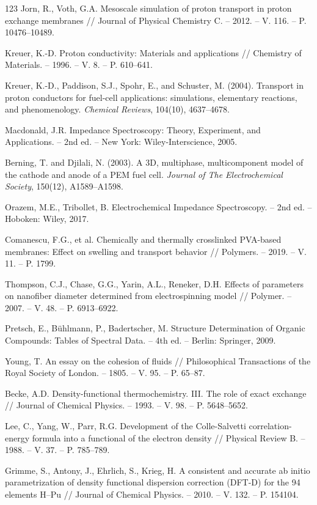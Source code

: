 \documentclass[12pt,a4paper]{report}
\begin{document}
\begin{thebibliography}{123}
 Jorn, R., Voth, G.A. Mesoscale simulation of proton transport in proton exchange membranes // Journal of Physical Chemistry C. – 2012. – V. 116. – P. 10476–10489.

 Kreuer, K.-D. Proton conductivity: Materials and applications // Chemistry of Materials. – 1996. – V. 8. – P. 610–641.

 Kreuer, K.-D., Paddison, S.J., Spohr, E., and Schuster, M. (2004). Transport in proton conductors for fuel-cell applications: simulations, elementary reactions, and phenomenology. \textit{Chemical Reviews}, 104(10), 4637–4678.

 Macdonald, J.R. Impedance Spectroscopy: Theory, Experiment, and Applications. – 2nd ed. – New York: Wiley-Interscience, 2005.

 Berning, T. and Djilali, N. (2003). A 3D, multiphase, multicomponent model of the cathode and anode of a PEM fuel cell. \textit{Journal of The Electrochemical Society}, 150(12), A1589–A1598.

 Orazem, M.E., Tribollet, B. Electrochemical Impedance Spectroscopy. – 2nd ed. – Hoboken: Wiley, 2017.

 Comanescu, F.G., et al. Chemically and thermally crosslinked PVA-based membranes: Effect on swelling and transport behavior // Polymers. – 2019. – V. 11. – P. 1799.

 Thompson, C.J., Chase, G.G., Yarin, A.L., Reneker, D.H. Effects of parameters on nanofiber diameter determined from electrospinning model // Polymer. – 2007. – V. 48. – P. 6913–6922.

 Pretsch, E., Bühlmann, P., Badertscher, M. Structure Determination of Organic Compounds: Tables of Spectral Data. – 4th ed. – Berlin: Springer, 2009.

 Young, T. An essay on the cohesion of fluids // Philosophical Transactions of the Royal Society of London. – 1805. – V. 95. – P. 65–87.

 Becke, A.D. Density-functional thermochemistry. III. The role of exact exchange // Journal of Chemical Physics. – 1993. – V. 98. – P. 5648–5652.

 Lee, C., Yang, W., Parr, R.G. Development of the Colle-Salvetti correlation-energy formula into a functional of the electron density // Physical Review B. – 1988. – V. 37. – P. 785–789.

 Grimme, S., Antony, J., Ehrlich, S., Krieg, H. A consistent and accurate ab initio parametrization of density functional dispersion correction (DFT-D) for the 94 elements H–Pu // Journal of Chemical Physics. – 2010. – V. 132. – P. 154104.


\end{thebibliography}
\end{document}
